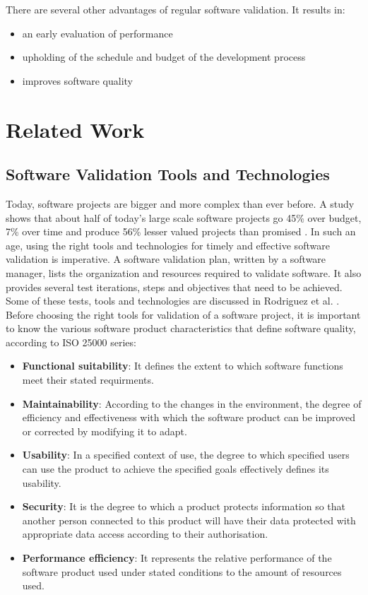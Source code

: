 \documentclass[journal, onecolumn]{IEEEtran}
\begin{document}
	\newline \newline
	There are several other advantages of regular software validation. It results in:
	\begin{itemize}
		\item an early evaluation of performance
		\item upholding of the schedule and budget of the development process
		\item improves software quality
	\end{itemize}
	
	\section{Related Work}
	\bigskip
	\subsection{Software Validation Tools and Technologies}
	\bigskip
	Today, software projects are bigger and more complex than ever before. A study shows that about half of today's large scale software projects go 45\% over budget, 7\% over time and produce 56\% lesser valued projects than promised \cite{mckinsey}. In such an age, using the right tools and technologies for timely and effective software validation is imperative. 
	\newline \newline
	A software validation plan, written by a software manager, lists the organization and resources required to validate software. It also provides several test iterations, steps and objectives that need to be achieved. Some of these tests, tools and technologies are discussed in Rodriguez et al. \cite{tools}.
	\newline \newline
	Before choosing the right tools for validation of a software project, it is important to know the various software product characteristics that define software quality, according to ISO 25000 \cite{iso25000} series:
	\begin{itemize}
		\item \textbf{Functional suitability}: It defines the extent to which software functions meet their stated requirments.
		\item \textbf{Maintainability}: According to the changes in the environment, the degree of efficiency and effectiveness with which the software product can be improved or corrected by modifying it to adapt.
		\item \textbf{Usability}: In a specified context of use, the degree to which specified users can use the product to achieve the specified goals effectively defines its usability.
		\item \textbf{Security}: It is the degree to which a product protects information so that another person connected to this product will have their data protected with appropriate data access according to their authorisation.
		\item \textbf{Performance efficiency}: It represents the relative performance of the software product used under stated conditions to the amount of resources used.		
	\end{itemize}
	
\end{document}
